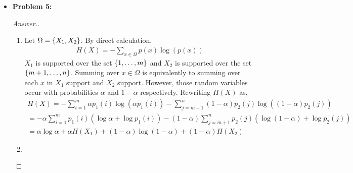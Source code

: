 \documentclass[10pt,twoside]{article}
\begin{document}
\begin{itemize}
    \item\textbf{Problem 5:} \newline
    \noindent\makebox[\linewidth]{\rule{18cm}{0.4pt}}
    \begin{proof}[Answer.]
    \begin{enumerate}[label=(\alph*.)]
        \item 
    Let $\Omega = \{X_1,X_2\}$. By direct calculation,
    \begin{gather*}
        H(X) = -\sum_{x\in\Omega}p(x)\log(p(x))
    \end{gather*}
    $X_1$ is supported over the set $\{1,\ldots, m\}$ and $X_2$ is supported over the set $\{m+1,\ldots, n\}$. Summing over $x\in\Omega$ is equivalently to summing over each $x$ in $X_1$ support and $X_2$ support. However, those random variables occur with probabilities $\alpha$ and $1-\alpha$ respectively. Rewriting $H(X)$ as,
    \begin{gather*}
        H(X) = -\sum_{i=1}^m \alpha p_1(i)\log (\alpha p_1(i)) - \sum_{j=m+1}^n(1-\alpha) p_2(j)\log ((1-\alpha)p_2(j))  \\
        = -\alpha \sum_{i=1}^m p_1(i) (\log\alpha + \log p_1(i)) - (1-\alpha)\sum_{j=m+1}^n p_2(j)(\log(1-\alpha) + \log p_2(j)) \\
        = \alpha \log \alpha + \alpha H(X_1) + (1-\alpha)\log(1-\alpha) + (1-\alpha)H(X_2)
    \end{gather*}

    \item 
     \end{enumerate}
    \end{proof}
\end{itemize}

\label{LastPage}
\end{document}
